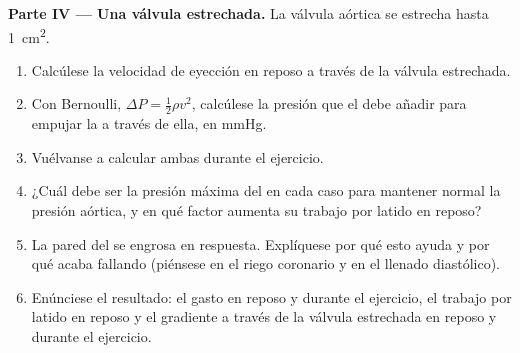 \begin{problem}
\medskip
\noindent\textbf{Parte IV --- Una válvula estrechada.}
La válvula aórtica se estrecha hasta \qty{1}{cm^2}.
\begin{enumerate}[resume]
  \item Calcúlese la velocidad de eyección en reposo a través de la válvula
        estrechada.
  \item Con Bernoulli, $\Delta P = \tfrac12\rho v^{2}$, calcúlese la
        presión que el  debe añadir para empujar la  a
        través de ella, en mmHg.
  \item Vuélvanse a calcular ambas durante el ejercicio.
  \item ¿Cuál debe ser la presión máxima del  en cada caso para
        mantener normal la presión aórtica, y en qué factor aumenta su
        trabajo por latido en reposo?
  \item La pared del  se engrosa en respuesta. Explíquese por qué
        esto ayuda y por qué acaba fallando (piénsese en el riego coronario
        y en el llenado diastólico).
  \item Enúnciese el resultado: el gasto en reposo y durante el ejercicio,
        el trabajo por latido en reposo y el gradiente a través de la
        válvula estrechada en reposo y durante el ejercicio.
\end{enumerate}
\end{problem}
